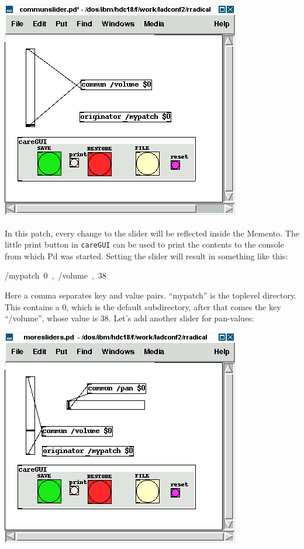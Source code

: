\documentclass[10pt,english]{scrartcl}
\begin{document}
\includegraphics{communslider.png}

In this patch, every change to the slider will be reflected inside the
Memento. The little print button in \texttt{careGUI} can be used to print the
contents to the console from which Pd was started. Setting the slider will
result in something like this:
\begin{ttfamily}\begin{flushleft}
\mbox{/mypatch~0~,~/volume~,~38}
\end{flushleft}\end{ttfamily}

Here a comma separates key and value pairs. ``mypatch'' is the toplevel
directory. This contains a 0, which is the default subdirectory, after that
comes the key ``/volume'', whose value is 38. Let's add another slider for
pan-values:

\includegraphics{moresliders.png}
\end{document}
